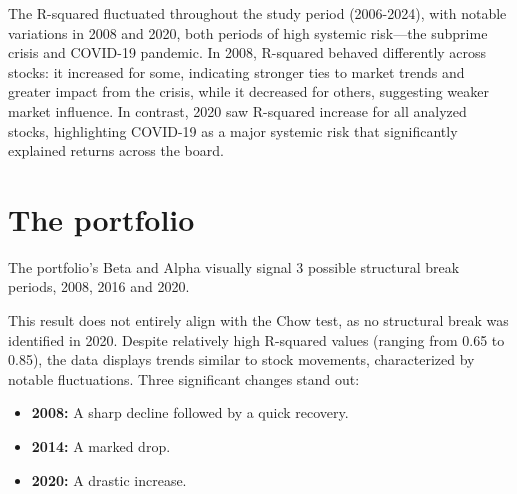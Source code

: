 The R-squared fluctuated throughout the study period (2006-2024), with notable variations in 2008 and 2020, both periods of 
high systemic risk—the subprime crisis and COVID-19 pandemic.
In 2008, R-squared behaved differently across stocks: it increased for some, indicating stronger ties to market trends and
greater impact from the crisis, while it decreased for others, suggesting weaker market influence.
In contrast, 2020 saw R-squared increase for all analyzed stocks, highlighting COVID-19 as a major systemic risk that 
significantly explained returns across the board.

\section{The portfolio}
The portfolio's Beta and Alpha visually signal 3 possible structural break periods, 2008, 2016 and 2020.
 
This result does not entirely align with the Chow test, as no structural break was identified in 2020.
Despite relatively high R-squared values (ranging from 0.65 to 0.85), the data displays trends similar to stock movements, 
characterized by notable fluctuations.
Three significant changes stand out:
\begin{itemize}
    \item \textbf{2008:} A sharp decline followed by a quick recovery.
    \item \textbf{2014:} A marked drop.
    \item \textbf{2020:} A drastic increase.
\end{itemize}